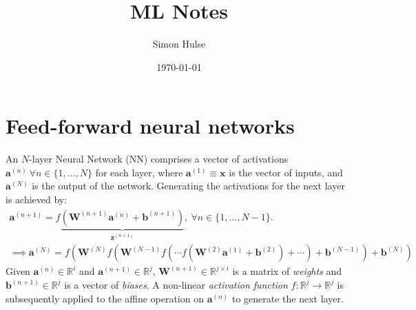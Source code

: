 \documentclass{sgh_article}
\author{Simon Hulse}
\date{\today}
\title{ML Notes}
\begin{document}
    \maketitle

    \section{Feed-forward neural networks}
        An $N$-layer Neural Network (NN) comprises a vector of activations
        $\symbf{a}^{(n)}\ \forall n \in \{1, \dots, N\}$ for each layer, where
        $\symbf{a}^{(1)} \equiv \symbf{x}$ is the vector of inputs, and
        $\symbf{a}^{(N)}$ is the output of the network. Generating the
        activations for the next layer is achieved by:
        \begin{equation}
            \begin{gathered}
                \symbf{a}^{(n+1)} = f \underbrace{
                    \left(
                        \symbf{W}^{(n+1)} \symbf{a}^{(n)} +
                        \symbf{b}^{(n+1)}
                    \right)
                }_{\symbf{z}^{(n+1)}},\
                \forall n \in \{1, \dots, N-1\}. \\
                \implies \symbf{a}^{(N)} = f \left(
                    \symbf{W}^{(N)} f \left(
                        \symbf{W}^{(N-1)} f \left(
                            \cdots f \left(
                                \symbf{W}^{(2)} \symbf{a}^{(1)} + \symbf{b}^{(2)}
                            \right) + \cdots
                        \right) + \symbf{b}^{(N-1)}
                    \right) + \symbf{b}^{(N)}
               \right)
            \end{gathered}
        \end{equation}
        Given $\symbf{a}^{(n)} \in \mathbb{R}^{i}$ and $\symbf{a}^{(n+1)} \in
        \mathbb{R}^j$, $\symbf{W}^{(n+1)} \in \mathbb{R}^{j \times i}$ is a
        matrix of \textit{weights} and $\symbf{b}^{(n+1)} \in \mathbb{R}^{j}$
        is a vector of \textit{biases}. A non-linear \textit{activation
        function} $f: \mathbb{R}^j \rightarrow \mathbb{R}^j$ is subsequently
        applied to the affine operation on $\symbf{a}^{(n)}$ to generate the
        next layer.
\end{document}
